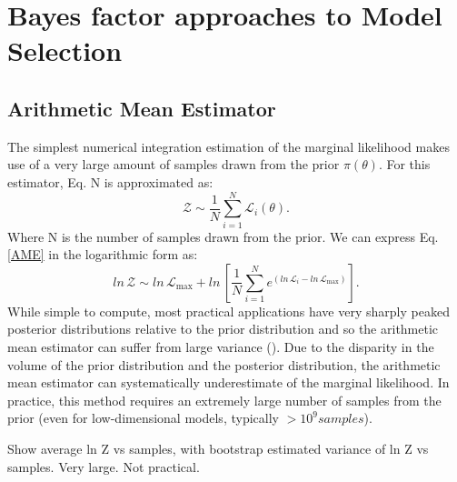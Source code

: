 \section{Bayes factor approaches to Model Selection}
\subsection{Arithmetic Mean Estimator}
The simplest numerical integration estimation of the marginal likelihood makes use of a very large amount of samples drawn from the prior $\pi(\theta)$. For this estimator, Eq. N is approximated as:
\begin{equation}\label{AME}
    \mathcal{Z} \sim \frac{1}{N} \sum_{i=1}^{N} \mathcal{L}_i \left(\theta\right).
\end{equation}
Where N is the number of samples drawn from the prior. We can express Eq. \ref{AME} in the logarithmic form as:
\begin{equation}\label{logAME}
    ln \, \mathcal{Z} \sim  ln \, \mathcal{L}_\mathrm{max} + ln \, 
    \left [ \frac{1}{N} \sum_{i=1}^{N} e^{\left(ln \, \mathcal{L}_i - ln \, \mathcal{L}_\mathrm{max} \right)} \right ].
\end{equation}
While simple to compute, most practical applications have very sharply peaked posterior distributions relative to the prior distribution and so the arithmetic mean estimator can suffer from large variance (). Due to the disparity in the volume of the prior distribution and the posterior distribution, the arithmetic mean estimator can systematically underestimate of the marginal likelihood. In practice, this method requires an extremely large number of samples from the prior (even for low-dimensional models, typically $> 10^9 samples$).

Show average ln Z vs samples, with bootstrap estimated variance of ln Z vs samples. Very large. Not practical.

